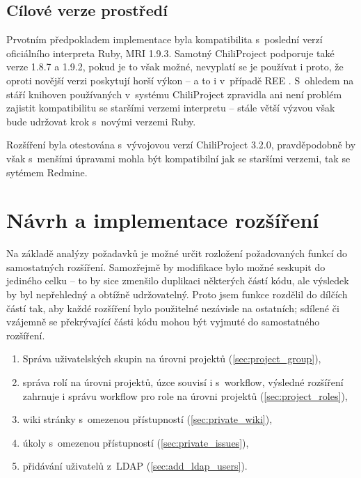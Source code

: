 \documentclass[thesis=B,czech]{FITthesis}[2012/05/02]
\begin{document}
\section{Cílové verze prostředí}

Prvotním předpokladem implementace byla kompatibilita s~poslední verzí
oficiálního interpreta Ruby, \gls{MRI} 1.9.3. Samotný ChiliProject
podporuje také verze 1.8.7 a 1.9.2, pokud je to však možné, nevyplatí se
je používat i proto, že oproti novější verzi poskytují horší výkon -- a
to i v~případě \gls{REE} \citep[End of Life]{REEEOL}. S~ohledem na stáří
knihoven používaných v~systému ChiliProject zpravidla ani není problém
zajistit kompatibilitu se staršími verzemi interpretu -- stále větší
výzvou však bude udržovat krok s~novými verzemi Ruby.

Rozšíření byla otestována s~vývojovou verzí ChiliProject 3.2.0,
pravděpodobně by však s~menšími úpravami mohla být kompatibilní jak se
staršími verzemi, tak se sytémem Redmine.

\chapter{Návrh a implementace rozšíření}

Na základě analýzy požadavků je možné určit rozložení požadovaných
funkcí do samostatných rozšíření. Samozřejmě by modifikace bylo možné
seskupit do jediného celku -- to by sice zmenšilo duplikaci některých částí kódu,
ale výsledek by byl nepřehledný a obtížně udržovatelný. Proto jsem funkce
rozdělil do dílčích částí tak, aby každé rozšíření bylo použitelné
nezávisle na ostatních; sdílené či vzájemně se překrývající části kódu
mohou být vyjmuté do samostatného rozšíření.

\begin{enumerate}
\item Správa uživatelských skupin na úrovni projektů (\ref{sec:project_group}),
\item správa rolí na úrovni projektů, úzce souvisí i s~\gls{workflow}, výsledné rozšíření zahrnuje i
správu workflow pro role na úrovni projektů (\ref{sec:project_roles}),
\item wiki stránky s~omezenou přístupností (\ref{sec:private_wiki}),
\item úkoly s~omezenou přístupností (\ref{sec:private_issues}),
\item přidávání uživatelů z~\gls{LDAP} (\ref{sec:add_ldap_users}).
\end{enumerate}
\end{document}
